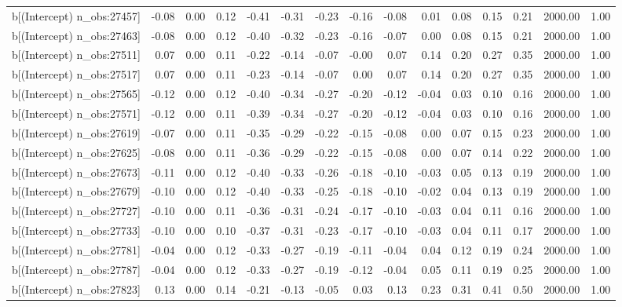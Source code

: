 \begin{table}[ht]
\begin{tabular}{rrrrrrrrrrrrrrr}
  b[(Intercept) n\_obs:27457] & -0.08 & 0.00 & 0.12 & -0.41 & -0.31 & -0.23 & -0.16 & -0.08 & 0.01 & 0.08 & 0.15 & 0.21 & 2000.00 & 1.00 \\ 
  b[(Intercept) n\_obs:27463] & -0.08 & 0.00 & 0.12 & -0.40 & -0.32 & -0.23 & -0.16 & -0.07 & 0.00 & 0.08 & 0.15 & 0.21 & 2000.00 & 1.00 \\ 
  b[(Intercept) n\_obs:27511] & 0.07 & 0.00 & 0.11 & -0.22 & -0.14 & -0.07 & -0.00 & 0.07 & 0.14 & 0.20 & 0.27 & 0.35 & 2000.00 & 1.00 \\ 
  b[(Intercept) n\_obs:27517] & 0.07 & 0.00 & 0.11 & -0.23 & -0.14 & -0.07 & 0.00 & 0.07 & 0.14 & 0.20 & 0.27 & 0.35 & 2000.00 & 1.00 \\ 
  b[(Intercept) n\_obs:27565] & -0.12 & 0.00 & 0.12 & -0.40 & -0.34 & -0.27 & -0.20 & -0.12 & -0.04 & 0.03 & 0.10 & 0.16 & 2000.00 & 1.00 \\ 
  b[(Intercept) n\_obs:27571] & -0.12 & 0.00 & 0.11 & -0.39 & -0.34 & -0.27 & -0.20 & -0.12 & -0.04 & 0.03 & 0.10 & 0.16 & 2000.00 & 1.00 \\ 
  b[(Intercept) n\_obs:27619] & -0.07 & 0.00 & 0.11 & -0.35 & -0.29 & -0.22 & -0.15 & -0.08 & 0.00 & 0.07 & 0.15 & 0.23 & 2000.00 & 1.00 \\ 
  b[(Intercept) n\_obs:27625] & -0.08 & 0.00 & 0.11 & -0.36 & -0.29 & -0.22 & -0.15 & -0.08 & 0.00 & 0.07 & 0.14 & 0.22 & 2000.00 & 1.00 \\ 
  b[(Intercept) n\_obs:27673] & -0.11 & 0.00 & 0.12 & -0.40 & -0.33 & -0.26 & -0.18 & -0.10 & -0.03 & 0.05 & 0.13 & 0.19 & 2000.00 & 1.00 \\ 
  b[(Intercept) n\_obs:27679] & -0.10 & 0.00 & 0.12 & -0.40 & -0.33 & -0.25 & -0.18 & -0.10 & -0.02 & 0.04 & 0.13 & 0.19 & 2000.00 & 1.00 \\ 
  b[(Intercept) n\_obs:27727] & -0.10 & 0.00 & 0.11 & -0.36 & -0.31 & -0.24 & -0.17 & -0.10 & -0.03 & 0.04 & 0.11 & 0.16 & 2000.00 & 1.00 \\ 
  b[(Intercept) n\_obs:27733] & -0.10 & 0.00 & 0.10 & -0.37 & -0.31 & -0.23 & -0.17 & -0.10 & -0.03 & 0.04 & 0.11 & 0.17 & 2000.00 & 1.00 \\ 
  b[(Intercept) n\_obs:27781] & -0.04 & 0.00 & 0.12 & -0.33 & -0.27 & -0.19 & -0.11 & -0.04 & 0.04 & 0.12 & 0.19 & 0.24 & 2000.00 & 1.00 \\ 
  b[(Intercept) n\_obs:27787] & -0.04 & 0.00 & 0.12 & -0.33 & -0.27 & -0.19 & -0.12 & -0.04 & 0.05 & 0.11 & 0.19 & 0.25 & 2000.00 & 1.00 \\ 
  b[(Intercept) n\_obs:27823] & 0.13 & 0.00 & 0.14 & -0.21 & -0.13 & -0.05 & 0.03 & 0.13 & 0.23 & 0.31 & 0.41 & 0.50 & 2000.00 & 1.00 \\ 

\end{tabular}
\end{table}
